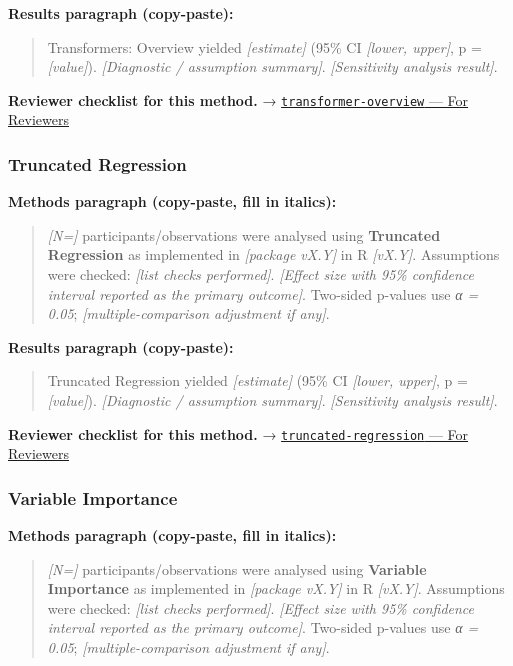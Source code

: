 \documentclass[
]{article}
\begin{document}
\textbf{Results paragraph (copy-paste):}

\begin{quote}
Transformers: Overview yielded \emph{{[}estimate{]}} (95\% CI
\emph{{[}lower, upper{]}}, p = \emph{{[}value{]}}). \emph{{[}Diagnostic
/ assumption summary{]}}. \emph{{[}Sensitivity analysis result{]}}.
\end{quote}

\textbf{Reviewer checklist for this method.} →
\href{../chapters/13-ml/transformer-overview.Rmd\#for-reviewers}{\texttt{transformer-overview}
--- For Reviewers}

\subsubsection{Truncated Regression}\label{truncated-regression}

\textbf{Methods paragraph (copy-paste, fill in italics):}

\begin{quote}
\emph{{[}N={]}} participants/observations were analysed using
\textbf{Truncated Regression} as implemented in \emph{{[}package
vX.Y{]}} in R \emph{{[}vX.Y{]}}. Assumptions were checked: \emph{{[}list
checks performed{]}}. \emph{{[}Effect size with 95\% confidence interval
reported as the primary outcome{]}}. Two-sided p-values use \emph{α =
0.05}; \emph{{[}multiple-comparison adjustment if any{]}}.
\end{quote}

\textbf{Results paragraph (copy-paste):}

\begin{quote}
Truncated Regression yielded \emph{{[}estimate{]}} (95\% CI
\emph{{[}lower, upper{]}}, p = \emph{{[}value{]}}). \emph{{[}Diagnostic
/ assumption summary{]}}. \emph{{[}Sensitivity analysis result{]}}.
\end{quote}

\textbf{Reviewer checklist for this method.} →
\href{../chapters/07-regression/truncated-regression.Rmd\#for-reviewers}{\texttt{truncated-regression}
--- For Reviewers}

\subsubsection{Variable Importance}\label{variable-importance}

\textbf{Methods paragraph (copy-paste, fill in italics):}

\begin{quote}
\emph{{[}N={]}} participants/observations were analysed using
\textbf{Variable Importance} as implemented in \emph{{[}package vX.Y{]}}
in R \emph{{[}vX.Y{]}}. Assumptions were checked: \emph{{[}list checks
performed{]}}. \emph{{[}Effect size with 95\% confidence interval
reported as the primary outcome{]}}. Two-sided p-values use \emph{α =
0.05}; \emph{{[}multiple-comparison adjustment if any{]}}.
\end{quote}
\end{document}

